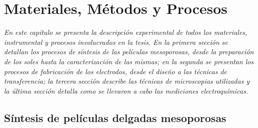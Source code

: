  \newcommand{\NoBiblioMat}[1]{
 \ifthenelse{\equal{#1}{verdadero}}{}{}
 \NoBiblioMat{verdadero}}


 \FormatoCapituloUnaLinea

 \chapter{Materiales, Métodos y Procesos}\label{chap:Materiales}

 \thispagestyle{empty}
	
  \noindent\textit{En este capitulo se presenta la descripción experimental de todos los materiales, instrumental y procesos involucrados en la tesis. En la primera sección se detallan los procesos de síntesis de las películas mesoporosas, desde la preparación de los soles hasta la caracterización de las mismas; en la segunda se presentan los procesos de fabricación de los electrodos, desde el diseño a las técnicas de transferencia; la tercera sección describe las técnicas de microscopias utilizadas y la última sección detalla como se llevaron a cabo las mediciones electroquímicas.}


 \vfill
 \minitoc
 \newpage


\section{Síntesis de películas delgadas mesoporosas}\label{sec:sintesis_mesoporosos}	
	
